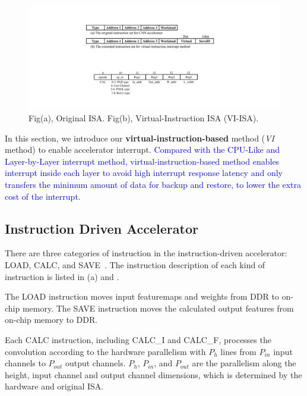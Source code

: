 \begin{figure}[t]
	\centering
	\includegraphics[width=0.99\linewidth]{fig/instructions.pdf}
	\vspace{-6mm}
	\caption{Fig(a), Original ISA. Fig(b), Virtual-Instruction ISA (VI-ISA).}
	\label{fig:instructions}
\end{figure}

In this section, we introduce our \textbf{virtual-instruction-based} method (\textit{VI} method) to enable accelerator interrupt. 
\textcolor{blue}{
Compared with the CPU-Like and Layer-by-Layer interrupt method, virtual-instruction-based method enables interrupt inside each layer to avoid high interrupt response latency and only transfers the minimum amount of data for backup and restore, to lower the extra cost of the interrupt.
}



\subsection{ Instruction Driven Accelerator }
\label{sec:instrAcc}
There are three categories of instruction in the instruction-driven accelerator: LOAD, CALC, and SAVE~\cite{guo2017angel,qiu2016going,yu2018instruction}. The instruction description of each kind of instruction is listed in (a) and .

The LOAD instruction moves input featuremaps and weights from DDR to on-chip memory. The SAVE instruction moves the calculated output features from on-chip memory to DDR. 

Each CALC instruction, including CALC\_I and CALC\_F, processes the convolution according to the hardware parallelism with $P_{h}$ lines from $ P_{in} $ input channels to $ P_{out}$ output channels. $P_{h}$, $ P_{in} $, and $ P_{out} $ are the parallelism along the height, input channel and output channel dimensions, which is determined by the hardware and original ISA.

